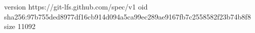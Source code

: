 version https://git-lfs.github.com/spec/v1
oid sha256:97b755ded8977df16cb914d094a5ca99ec289ae9167fb7c2558582f23b74b8f8
size 11092
